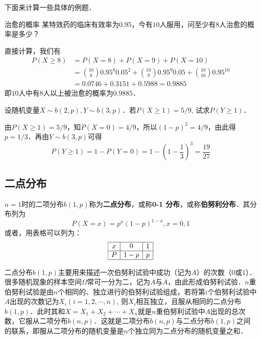 下面来计算一些具体的例题．
\begin{example}{治愈的概率}
某特效药的临床有效率为$0. 95$，今有$10 $人服用，问至少有$8 $人治愈的概率是多少？

直接计算，我们有
\begin{equation}
\begin{aligned} P(X \geqslant 8) &=P(X=8)+P(X=9)+P(X=10) \\ &=\binom{10}{8} 0.95^{8} 0.05^{2}+\binom{10}{9} 0.95^{9} 0.05+\binom{10}{10} 0.95^{10} \\ &=0.0746+0.3151+0.5988=0.9885 \end{aligned}
\end{equation}
即$10 $人中有$8 $人以上被治愈的概率为$0. 988 5$．
\end{example}

\begin{example}{}
设随机变量$X\sim b(2,p),Y\sim b(3,p)$．若$P (X\geqslant1) = 5/9$, 试求$P(Y\geqslant1)$．

由$P(X\geqslant1)=5/9$，知$P(X=0)=4/9$，所以$(1-p)^2=4/9$，由此得$p=1/3$．再由$Y\sim b(3,p)$可得
\begin{equation}
P(Y \geqslant 1)=1-P(Y=0)=1-\left(1-\frac{1}{3}\right)^{3}=\frac{19}{27}
\end{equation}
\end{example}

\subsection{二点分布}
$n=1$时的二项分布$b (1 ,p)$称为\textbf{二点分布}，或称\textbf{0-1 分布}，或称\textbf{伯努利分布}．其分布列为
\begin{equation}
P(X=x)=p^{x}(1-p)^{1-x}, x=0,1
\end{equation}
或者，用表格可以列为：
\begin{equation}
\begin{array}{|c|c|c|}\hline x & 0 & 1 \\ \hline P & 1-p & p \\ \hline  \end{array}
\end{equation}

二点分布$b(1 ,p) $主要用来描述一次伯努利试验中成功（记为$A$）的次数（$0$或$1$）．很多随机现象的样本空间$\Omega$常可一分为二，记为$A $与$\overline A$，由此形成伯努利试验．$n $重伯努利试验是由$n $个相同的、独立进行的伯努利试验组成，若将第$i $个伯努利试验中$A $出现的次数记为$X_i (i= 1,2, \cdots, n)$, 则$X_i$相互独立，且服从相同的二点分布$b(1 ,p)$．此时其和$X=X_1+X_2+\cdots+X_n$就是$n $重伯努利试验中$A $出现的总次数，它服从二项分布$b(n,p)$．这就是二项分布$b (n ,p) $与二点分布$b(1,p)$之间的联系，即服从二项分布的随机变量是$n$个独立同为二点分布的随机变量之和．

